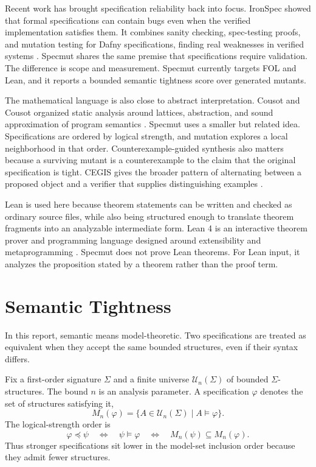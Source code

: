 \documentclass[11pt]{article}
\begin{document}
Recent work has brought specification reliability back into focus. IronSpec showed that formal specifications can contain bugs even when the verified implementation satisfies them. It combines sanity checking, spec-testing proofs, and mutation testing for Dafny specifications, finding real weaknesses in verified systems \cite{goldweber2024}. Specmut shares the same premise that specifications require validation. The difference is scope and measurement. Specmut currently targets FOL and Lean, and it reports a bounded semantic tightness score over generated mutants.

The mathematical language is also close to abstract interpretation. Cousot and Cousot organized static analysis around lattices, abstraction, and sound approximation of program semantics \cite{cousot1977}. Specmut uses a smaller but related idea. Specifications are ordered by logical strength, and mutation explores a local neighborhood in that order. Counterexample-guided synthesis also matters because a surviving mutant is a counterexample to the claim that the original specification is tight. CEGIS gives the broader pattern of alternating between a proposed object and a verifier that supplies distinguishing examples \cite{jha2017}.

Lean is used here because theorem statements can be written and checked as ordinary source files, while also being structured enough to translate theorem fragments into an analyzable intermediate form. Lean 4 is an interactive theorem prover and programming language designed around extensibility and metaprogramming \cite{demoura2021}. Specmut does not prove Lean theorems. For Lean input, it analyzes the proposition stated by a theorem rather than the proof term.

\section{Semantic Tightness}

In this report, semantic means model-theoretic. Two specifications are treated as equivalent when they accept the same bounded structures, even if their syntax differs.

Fix a first-order signature $\Sigma$ and a finite universe $\mathcal U_n(\Sigma)$ of bounded $\Sigma$-structures. The bound $n$ is an analysis parameter. A specification $\varphi$ denotes the set of structures satisfying it,
\[
M_n(\varphi)=\{A\in\mathcal U_n(\Sigma)\mid A\models\varphi\}.
\]
The logical-strength order is
\[
\varphi\preceq\psi \quad\Longleftrightarrow\quad \psi\models\varphi \quad\Longleftrightarrow\quad M_n(\psi)\subseteq M_n(\varphi).
\]
Thus stronger specifications sit lower in the model-set inclusion order because they admit fewer structures.
\end{document}
